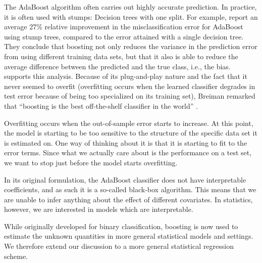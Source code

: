 The AdaBoost algorithm often carries out highly accurate prediction. In practice, it is often used with stumps: Decision trees with one split. For example, \citet{bauer-kohavi} report an average 27\% relative improvement in the misclassification error for AdaBoost using stump trees, compared to the error attained with a single decision tree. They conclude that boosting not only reduces the variance in the prediction error from using different training data sets, but that it also is able to reduce the average difference between the predicted and the true class, i.e., the bias. \citet{breiman1998} supports this analysis. Because of its plug-and-play nature and the fact that it never seemed to overfit (overfitting occurs when the learned classifier degrades in test error because of being too specialized on its training set), Breiman remarked that ``boosting is the best off-the-shelf classifier in the world'' \citep{ESL}.

Overfitting occurs when the out-of-sample error starts to increase. At this point, the model is starting to be too sensitive to the structure of the specific data set it is estimated on. One way of thinking about it is that it is starting to fit to the error terms. Since what we actually care about is the performance on a test set, we want to stop just before the model starts overfitting.

In its original formulation, the AdaBoost classifier does not have interpretable coefficients, and as such it is a so-called black-box algorithm. This means that we are unable to infer anything about the effect of different covariates. In statistics, however, we are interested in models which are interpretable.

While originally developed for binary classification, boosting is now used to estimate the unknown quantities in more general statistical models and settings. We therefore extend our discussion to a more general statistical regression scheme.


